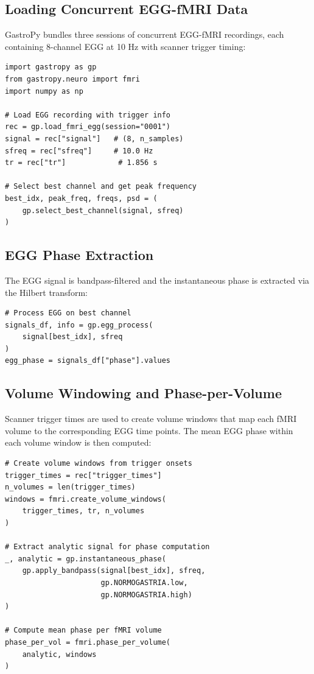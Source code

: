 \documentclass[12pt]{article}
\begin{document}
\subsection{Loading Concurrent EGG-fMRI Data}

GastroPy bundles three sessions of concurrent EGG-fMRI recordings, each
containing 8-channel EGG at 10 Hz with scanner trigger timing:

\begin{lstlisting}
import gastropy as gp
from gastropy.neuro import fmri
import numpy as np

# Load EGG recording with trigger info
rec = gp.load_fmri_egg(session="0001")
signal = rec["signal"]   # (8, n_samples)
sfreq = rec["sfreq"]     # 10.0 Hz
tr = rec["tr"]            # 1.856 s

# Select best channel and get peak frequency
best_idx, peak_freq, freqs, psd = (
    gp.select_best_channel(signal, sfreq)
)
\end{lstlisting}

\subsection{EGG Phase Extraction}

The EGG signal is bandpass-filtered and the instantaneous phase is extracted
via the Hilbert transform:

\begin{lstlisting}
# Process EGG on best channel
signals_df, info = gp.egg_process(
    signal[best_idx], sfreq
)
egg_phase = signals_df["phase"].values
\end{lstlisting}

\subsection{Volume Windowing and Phase-per-Volume}

Scanner trigger times are used to create volume windows that map each fMRI
volume to the corresponding EGG time points. The mean EGG phase within each
volume window is then computed:

\begin{lstlisting}
# Create volume windows from trigger onsets
trigger_times = rec["trigger_times"]
n_volumes = len(trigger_times)
windows = fmri.create_volume_windows(
    trigger_times, tr, n_volumes
)

# Extract analytic signal for phase computation
_, analytic = gp.instantaneous_phase(
    gp.apply_bandpass(signal[best_idx], sfreq,
                      gp.NORMOGASTRIA.low,
                      gp.NORMOGASTRIA.high)
)

# Compute mean phase per fMRI volume
phase_per_vol = fmri.phase_per_volume(
    analytic, windows
)
\end{lstlisting}
\end{document}
